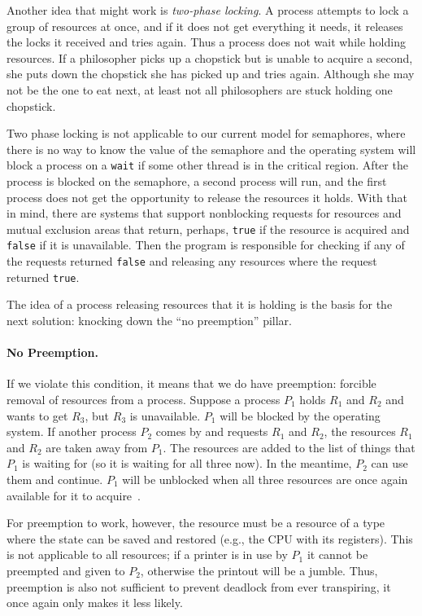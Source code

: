 Another idea that might work is \textit{two-phase locking}. A process attempts to lock a group of resources at once, and if it does not get everything it needs, it releases the locks it received and tries again. Thus a process does not wait while holding resources. If a philosopher picks up a chopstick but is unable to acquire a second, she puts down the chopstick she has picked up and tries again. Although she may not be the one to eat next, at least not all philosophers are stuck holding one chopstick.

Two phase locking is not applicable to our current model for semaphores, where there is no way to know the value of the semaphore and the operating system will block a process on a \texttt{wait} if some other thread is in the critical region. After the process is blocked on the semaphore, a second process will run, and the first process does not get the opportunity to release the resources it holds. With that in mind, there are systems that support nonblocking requests for resources and mutual exclusion areas that return, perhaps, \texttt{true} if the resource is acquired and \texttt{false} if it is unavailable. Then the program is responsible for checking if any of the requests returned \texttt{false} and releasing any resources where the request returned \texttt{true}.

The idea of a process releasing resources that it is holding is the basis for the next solution: knocking down the ``no preemption'' pillar.


\paragraph{No Preemption.} If we violate this condition, it means that we do have preemption: forcible removal of resources from a process. Suppose a process $P_{1}$ holds $R_{1}$ and $R_{2}$ and wants to get $R_{3}$, but $R_{3}$ is unavailable. $P_{1}$ will be blocked by the operating system. If another process $P_{2}$ comes by and requests $R_{1}$ and $R_{2}$, the resources $R_{1}$ and $R_{2}$ are taken away from $P_{1}$. The resources are added to the list of things that $P_{1}$ is waiting for (so it is waiting for all three now). In the meantime, $P_{2}$ can use them and continue. $P_{1}$ will be unblocked when all three resources are once again available for it to acquire~\cite{osc}.

For preemption to work, however, the resource must be a resource of a type where the state can be saved and restored (e.g., the CPU with its registers). This is not applicable to all resources; if a printer is in use by $P_{1}$ it cannot be preempted and given to $P_{2}$, otherwise the printout will be a jumble. Thus, preemption is also not sufficient to prevent deadlock from ever transpiring, it once again only makes it less likely.



